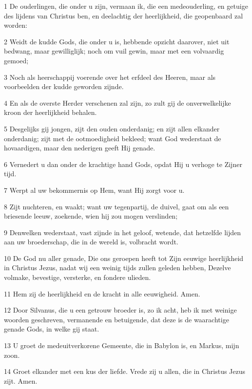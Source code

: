 \par 1 De ouderlingen, die onder u zijn, vermaan ik, die een medeouderling, en getuige des lijdens van Christus ben, en deelachtig der heerlijkheid, die geopenbaard zal worden:
\par 2 Weidt de kudde Gods, die onder u is, hebbende opzicht daarover, niet uit bedwang, maar gewilliglijk; noch om vuil gewin, maar met een volvaardig gemoed;
\par 3 Noch als heerschappij voerende over het erfdeel des Heeren, maar als voorbeelden der kudde geworden zijnde.
\par 4 En als de overste Herder verschenen zal zijn, zo zult gij de onverwelkelijke kroon der heerlijkheid behalen.
\par 5 Desgelijks gij jongen, zijt den ouden onderdanig; en zijt allen elkander onderdanig; zijt met de ootmoedigheid bekleed; want God wederstaat de hovaardigen, maar den nederigen geeft Hij genade.
\par 6 Vernedert u dan onder de krachtige hand Gods, opdat Hij u verhoge te Zijner tijd.
\par 7 Werpt al uw bekommernis op Hem, want Hij zorgt voor u.
\par 8 Zijt nuchteren, en waakt; want uw tegenpartij, de duivel, gaat om als een briesende leeuw, zoekende, wien hij zou mogen verslinden;
\par 9 Denwelken wederstaat, vast zijnde in het geloof, wetende, dat hetzelfde lijden aan uw broederschap, die in de wereld is, volbracht wordt.
\par 10 De God nu aller genade, Die ons geroepen heeft tot Zijn eeuwige heerlijkheid in Christus Jezus, nadat wij een weinig tijds zullen geleden hebben, Dezelve volmake, bevestige, versterke, en fondere ulieden.
\par 11 Hem zij de heerlijkheid en de kracht in alle eeuwigheid. Amen.
\par 12 Door Silvanus, die u een getrouw broeder is, zo ik acht, heb ik met weinige woorden geschreven, vermanende en betuigende, dat deze is de waarachtige genade Gods, in welke gij staat.
\par 13 U groet de medeuitverkorene Gemeente, die in Babylon is, en Markus, mijn zoon.
\par 14 Groet elkander met een kus der liefde. Vrede zij u allen, die in Christus Jezus zijt. Amen.




